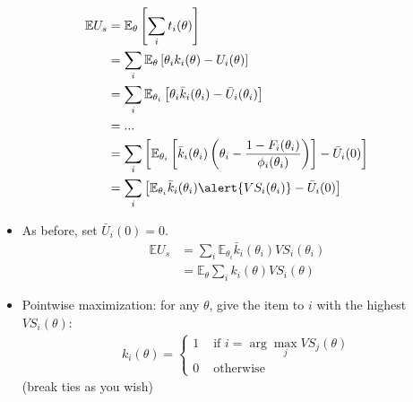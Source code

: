 \documentclass[english,handout]{beamer}		%
\def\lyxframeend{} %
\begin{document}
\begin{align*}
\mathbb{E} U_s &= \mathbb{E}_\theta \left[ \sum_i t_i(\theta) \right]
\\ &= \sum_i \mathbb{E}_{\theta} \left[ \theta_i k_i(\theta) - U_i(\theta) \right]
\\ &= \sum_i \mathbb{E}_{\theta_i} \left[ \theta_i \bar{k}_i(\theta_i) - \bar{U}_i(\theta_i) \right]
\\  &= ...
\\ &= \sum_i \left[ \mathbb{E}_{\theta_i} \left[ \bar{k}_i(\theta_i) \left( \theta_i - \frac{1-F_i(\theta_i)}{\phi_i(\theta_i)} \right) \right] - \bar{U}_i(0)\right]
\\ &= \sum_i \left[ \mathbb{E}_{\theta_i} \bar{k}_i(\theta_i) \alert{VS_i(\theta_i)} - \bar{U}_i(0) \right]
\end{align*}
\lyxframeend


\begin{itemize}
	\item As before, set $\bar{U}_i(0) = 0$.
	{\footnotesize
	\begin{align*}
		\mathbb{E} U_s &= \sum_i \mathbb{E}_{\theta_i} \bar{k}_i(\theta_i) VS_i(\theta_i)
		\\
		&= \mathbb{E}_{\theta} \sum_i k_i(\theta) VS_i(\theta)
	\end{align*}
	}
	\item Pointwise maximization: for any $\theta$, give the item to $i$ with the highest $VS_i(\theta)$:
	\begin{align*}
		k_i(\theta) = 
		\begin{cases}
			1 & \text{ if } i = \arg \max_j VS_j(\theta)
			\\
			0 & \text { otherwise}
		\end{cases}
	\end{align*}
	(break ties as you wish)
\end{itemize}
\lyxframeend
\end{document}
